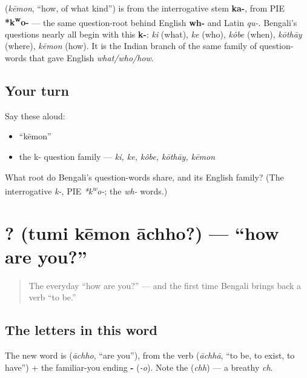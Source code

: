 \begin{cousinweb}
\textbf{} (\emph{kēmon}, \textquotedblleft{}how, of what kind\textquotedblright{}) is from the interrogative stem \textbf{ka-}, from PIE \textbf{*k\textsuperscript{w}o-} — the same question-root behind English \textbf{wh-} and Latin \emph{qu-}. Bengali's questions nearly all begin with this \textbf{k-}: \emph{ki} (what), \emph{ke} (who), \emph{kôbe} (when), \emph{kōthāy} (where), \emph{kēmon} (how). It is the Indian branch of the same family of question-words that gave English \emph{what/who/how}.
\end{cousinweb}

\subsection*{Your turn}
Say these aloud:

\begin{itemize}
\raggedright
  \item \textquotedblleft{}kēmon\textquotedblright{}
  \item the k- question family — \emph{ki, ke, kôbe, kōthāy, kēmon}
\end{itemize}

\begin{tcolorbox}[breakable,colback=teal!4,colframe=teal!35!black,title={Before you move on}]
What root do Bengali's question-words share, and its English family? (The interrogative \emph{k-}, PIE \emph{*k\textsuperscript{w}o-}; the \emph{wh-} words.)
\end{tcolorbox}
\section[\bn{তুমি} \bn{কেমন} \bn{আছো}?]{  ? (tumi kēmon āchho?) — \textquotedblleft{}how are you?\textquotedblright{}}

\label{lesson:BN-C03-tumi-kemon-achho}



\begin{quote}
The everyday \textquotedblleft{}how are you?\textquotedblright{} — and the first time Bengali brings back a verb \textquotedblleft{}to be.\textquotedblright{}
\end{quote}

\subsection*{The letters in this word}
The new word is \textbf{} (\emph{āchho}, \textquotedblleft{}are you\textquotedblright{}), from the verb \textbf{} (\emph{āchhā}, \textquotedblleft{}to be, to exist, to have\textquotedblright{}) + the familiar-you ending \textbf{-} (\emph{-o}). Note the \textbf{} (\emph{chh}) — a breathy \emph{ch}.

